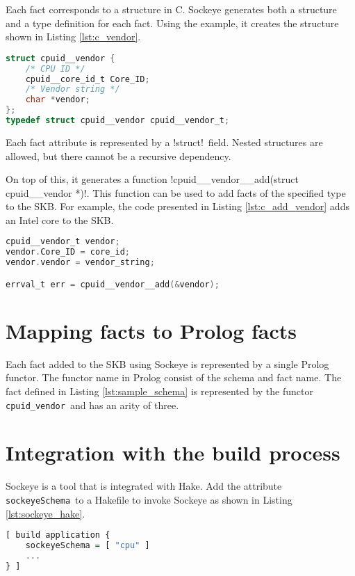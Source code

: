 \documentclass[a4paper,11pt,twoside]{report}
\begin{document}
{{Each fact corresponds to a structure in C. Sockeye generates both a structure
and a type definition for each fact. Using the example, it creates the
structure shown in Listing \ref{lst:c_vendor}.

\begin{lstlisting}[caption={C header for fact
\varname{vendor}},label={lst:c_vendor},language=C]
struct cpuid__vendor {
    /* CPU ID */
    cpuid__core_id_t Core_ID;
    /* Vendor string */
    char *vendor;
};
typedef struct cpuid__vendor cpuid__vendor_t;
\end{lstlisting}

Each fact attribute is represented by a \ccode!struct!~field. Nested structures are
allowed, but there cannot be a recursive dependency.

On top of this, it generates a function
\ccode!cpuid__vendor__add(struct cpuid__vendor *)!.
This function can be used to add facts of the specified type to the SKB. For
example, the code presented in Listing \ref{lst:c_add_vendor} adds an Intel core
to the SKB.

\begin{lstlisting}[caption={C example to add a vendor fact.},
label={lst:c_add_vendor}, language=C]
cpuid__vendor_t vendor;
vendor.Core_ID = core_id;
vendor.vendor = vendor_string;

errval_t err = cpuid__vendor__add(&vendor);
\end{lstlisting}

\section{Mapping facts to Prolog facts}

Each fact added to the SKB using Sockeye is represented by a single Prolog
functor.  The functor name in Prolog consist of the schema and fact name.  The
fact defined in Listing \ref{lst:sample_schema} is represented by the functor
\lstinline!cpuid_vendor!~and has an arity of three.

\section{Integration with the build process}

Sockeye is a tool that is integrated with Hake. Add the attribute
\lstinline!sockeyeSchema!~to a Hakefile to invoke Sockeye as shown in Listing
\ref{lst:sockeye_hake}.

\begin{lstlisting}[caption={Including Sockeye schemata in Hake},
label={lst:sockeye_hake}, language=Haskell]
[ build application {
    sockeyeSchema = [ "cpu" ]
    ... 
} ]
\end{lstlisting}

}}
\end{document}
